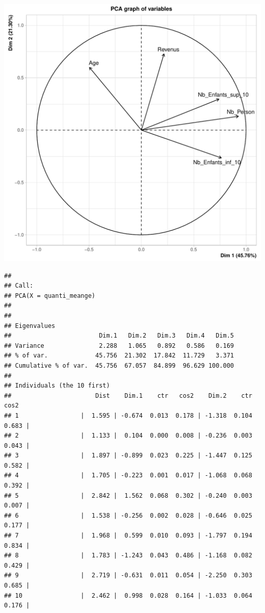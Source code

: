 \documentclass[11pt,a4paper, x11names]{article}\usepackage[]{graphicx}\usepackage[]{color}
\makeatletter
\def\maxwidth{ %
  \ifdim\Gin@nat@width>\linewidth
    \linewidth
  \else
    \Gin@nat@width
  \fi
}
\newenvironment{kframe}{%
 \def\at@end@of@kframe{}%
 \ifinner\ifhmode%
  \def\at@end@of@kframe{\end{minipage}}%
  \begin{minipage}{\columnwidth}%
 \fi\fi%
 \def\FrameCommand##1{\hskip\@totalleftmargin \hskip-\fboxsep
 \colorbox{shadecolor}{##1}\hskip-\fboxsep
     \hskip-\linewidth \hskip-\@totalleftmargin \hskip\columnwidth}%
 \MakeFramed {\advance\hsize-\width
   \@totalleftmargin\z@ \linewidth\hsize
   \@setminipage}}%
 {\par\unskip\endMakeFramed%
 \at@end@of@kframe}
\newenvironment{knitrout}{}{} %
\makeatother
\begin{document}
\begin{knitrout}
\includegraphics[width=\maxwidth]{figure/Analyse_factorielle-2} 
\begin{kframe}\begin{verbatim}
## 
## Call:
## PCA(X = quanti_meange) 
## 
## 
## Eigenvalues
##                        Dim.1   Dim.2   Dim.3   Dim.4   Dim.5
## Variance               2.288   1.065   0.892   0.586   0.169
## % of var.             45.756  21.302  17.842  11.729   3.371
## Cumulative % of var.  45.756  67.057  84.899  96.629 100.000
## 
## Individuals (the 10 first)
##                       Dist    Dim.1    ctr   cos2    Dim.2    ctr   cos2  
## 1                 |  1.595 | -0.674  0.013  0.178 | -1.318  0.104  0.683 |
## 2                 |  1.133 |  0.104  0.000  0.008 | -0.236  0.003  0.043 |
## 3                 |  1.897 | -0.899  0.023  0.225 | -1.447  0.125  0.582 |
## 4                 |  1.705 | -0.223  0.001  0.017 | -1.068  0.068  0.392 |
## 5                 |  2.842 |  1.562  0.068  0.302 | -0.240  0.003  0.007 |
## 6                 |  1.538 | -0.256  0.002  0.028 | -0.646  0.025  0.177 |
## 7                 |  1.968 |  0.599  0.010  0.093 | -1.797  0.194  0.834 |
## 8                 |  1.783 | -1.243  0.043  0.486 | -1.168  0.082  0.429 |
## 9                 |  2.719 | -0.631  0.011  0.054 | -2.250  0.303  0.685 |
## 10                |  2.462 |  0.998  0.028  0.164 | -1.033  0.064  0.176 |

\end{verbatim}
\end{kframe}
\end{knitrout}
\end{document}
